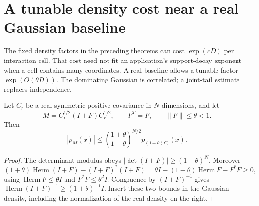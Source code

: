 
\section{A tunable density cost near a real Gaussian baseline}
\label{otg-section}

The fixed density factors in the preceding theorems can cost
$\exp(cD)$ per interaction cell. That cost need not fit an
application's support-decay exponent when a cell contains many
coordinates. A real baseline allows a tunable factor
$\exp(O(\theta D))$. The dominating Gaussian is correlated;
a joint-tail estimate replaces independence.

\begin{lemma}\label{otg-density-lemma}
Let $C_r$ be a real symmetric positive covariance in $N$
dimensions, and let
\[
 M=C_r^{1/2}(I+F)C_r^{1/2},\qquad F^T=F,\qquad
                       \|F\|\le\theta<1.
\]
Then
\begin{equation}\label{otg-density}
 |p_M(x)|
 \le\left(\frac{1+\theta}{1-\theta}\right)^{N/2}
                                p_{(1+\theta)C_r}(x).
\end{equation}
\end{lemma}
\begin{proof}
The determinant modulus obeys
$|\det(I+F)|\ge(1-\theta)^N$. Moreover
\[
 (1+\theta)\operatorname{Herm}(I+F)-(I+F)^*(I+F)
 =\theta I-(1-\theta)\operatorname{Herm}F-F^*F\ge0,
\]
using $\operatorname{Herm}F\le\theta I$ and
$F^*F\le\theta^2I$.
Congruence by $(I+F)^{-1}$ gives
$\operatorname{Herm}(I+F)^{-1}\ge(1+\theta)^{-1}I$.
Insert these two bounds in the Gaussian density, including
the normalization of the real density on the right.
\end{proof}

